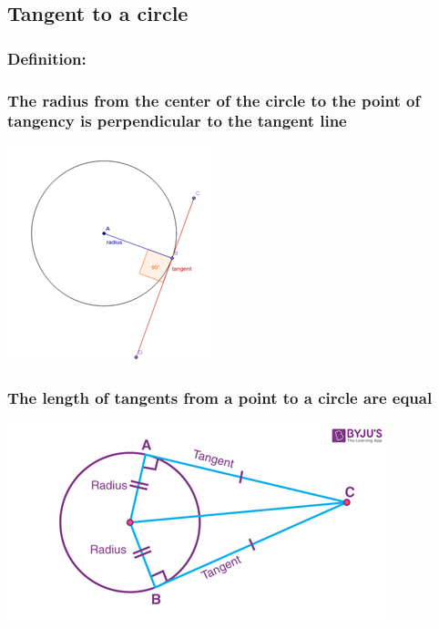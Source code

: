 \documentclass{article}
\begin{document}
\vspace{50px}

\subsection{Tangent to a circle}

\subsubsection{Definition:}
\vspace{20px}

\subsubsection{The radius from the center of the circle to the point of tangency is perpendicular to the tangent line}

\includegraphics{Picture6.png}

\pagebreak

\subsubsection{The length of tangents from a point to a circle are equal}

\includegraphics{Picture7.png}

\vspace{50px}
\end{document}
